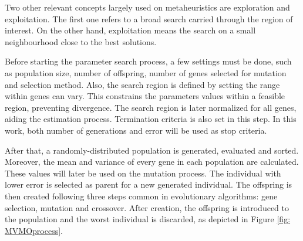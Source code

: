 Two other relevant concepts largely used on metaheuristics are exploration and exploitation. The first one refers to a broad search carried through the region of interest. On the other hand, exploitation means the search on a small neighbourhood close to the best solutions.

Before starting the parameter search process, a few settings must be done, such as population size, number of offspring, number of genes selected for mutation and selection method. Also, the search region is defined by setting the range within genes can vary. This constrains the parameters values within a feasible region, preventing divergence. The search region is later normalized for all genes, aiding the estimation process. Termination criteria is also set in this step. In this work, both number of generations and error will be used as stop criteria.

After that, a randomly-distributed population is generated, evaluated and sorted. Moreover, the mean and variance of every gene in each population are calculated. These values will later be used on the mutation process. The individual with lower error is selected as parent for a new generated individual. The offspring is then created following three steps common in evolutionary algorithms: gene selection, mutation and crossover. After creation, the offspring is introduced to the population and the worst individual is discarded, as depicted in Figure \ref{fig: MVMOprocess}.

